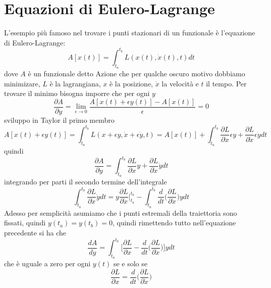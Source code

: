 \documentclass[11pt,a4paper]{report}
\theoremstyle{definition}
\theoremstyle{plain}
\theoremstyle{plain}
\begin{document}
		\section{Equazioni di Eulero-Lagrange}
			L'esempio più famoso nel trovare i punti stazionari di un funzionale è l'equazione di Eulero-Lagrange:
			\begin{equation}
				A[x(t)]=\int_{t_a}^{t_b}L(x(t),\dot{x}(t),t)dt
			\end{equation}
			dove $A$ è un funzionale detto Azione che per qualche oscuro motivo dobbiamo minimizare, $L$ è la lagrangiana, $x$ è la posizione, $\dot{x}$ la velocità e $t$ il tempo.
			Per trovare il minimo bisogna imporre che per ogni $y$
			\[
				\frac{\partial A}{\partial y}=\lim_{\epsilon \to 0}\frac{A[x(t)+\epsilon y(t)]-A[x(t)]}{\epsilon}=0
			\]
			sviluppo in Taylor il primo membro
			\[
				A[x(t)+\epsilon y(t)]=\int_{t_a}^{t_b}L(x+\epsilon y,\dot{x}+\epsilon \dot{y},t)=A[x(t)]+\int_{t_a}^{t_b}\frac{\partial{L}}{\partial{x}}\epsilon y+\frac{\partial{L}}{\partial{\dot{x}}}\epsilon \dot{y}dt
			\]
			quindi
			\[
				\frac{\partial A}{\partial y}=\int_{t_a}^{t_b}\frac{\partial{L}}{\partial{x}}y+\frac{\partial{L}}{\partial{\dot{x}}}\dot{y}dt
			\]
			integrando per parti il secondo termine dell'integrale
			\[
				\int_{t_a}^{t_b}\frac{\partial{L}}{\partial{\dot{x}}}\dot{y}dt=y\frac{\partial{L}}{\partial{\dot{x}}}\bigg\rvert_{t_a}^{t_b}-
				\int_{t_a}^{t_b}\frac{d}{dt}\bigg(\frac{\partial{L}}{\partial{\dot{x}}} \bigg)ydt
			\]
			Adesso per semplicità asumiamo che i punti estremali della traiettoria sono fissati, quindi $y(t_a)=y(t_b)=0$, quindi rimettendo tutto nell'equazione precedente si ha che
			\begin{equation}
				\frac{dA}{dy}=\int_{t_a}^{t_b}\bigg[\frac{\partial{L}}{\partial{x}}-\frac{d}{dt}\bigg(\frac{\partial{L}}{\partial{\dot{x}}} \bigg)\bigg]ydt
			\end{equation}
			che è uguale a zero per ogni $y(t)$ se e solo se 
			\begin{equation}
				\frac{\partial{L}}{\partial{x}}=\frac{d}{dt}\bigg(\frac{\partial{L}}{\partial{\dot{x}}} \bigg)
			\end{equation}
\end{document}
